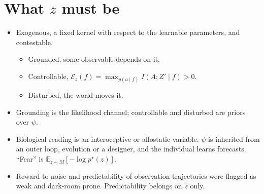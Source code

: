 \documentclass[10pt]{article}
\newcommand{\E}{\mathbb E}
\begin{document}
\section{What $z$ must be}
\begin{itemize}
  \item Exogenous, a fixed kernel with respect to the learnable parameters, and contestable.
  \begin{itemize}
    \item Grounded, some observable depends on it.
    \item Controllable, $\mathcal E_z(f) = \max_{p(a \mid f)} I(A;Z' \mid f) > 0$.
    \item Disturbed, the world moves it.
  \end{itemize}
  \item Grounding is the likelihood channel; controllable and disturbed are priors over $\psi$.
  \item Biological reading is an interoceptive or allostatic variable.
    $\psi$ is inherited from an outer loop, evolution or a designer, and the individual learns forecasts.
    ``Fear'' is $\E_{z \sim M}[-\log p^\star(z)]$.
  \item Reward-to-noise and predictability of observation trajectories were flagged as weak and dark-room prone.
    Predictability belongs on $z$ only.
\end{itemize}
\end{document}
